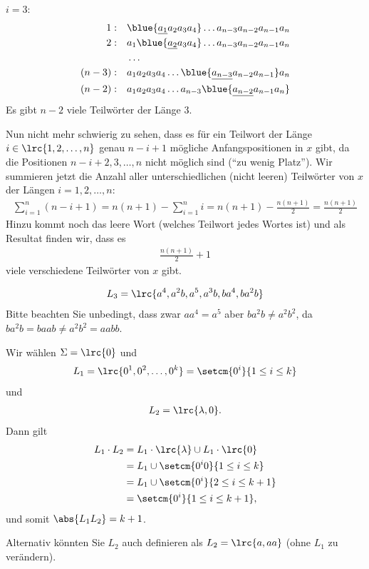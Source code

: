 \begin{myanswer}[mychallenge:0207]
	\underline{$i = 3$}:
	\begin{align*}
		1: \quad    & \blue{\underline{a_1}a_2a_3a_4}\ldots a_{n-3}a_{n-2}a_{n-1}a_n \\
		2: \quad    & a_1\blue{\underline{a_2}a_3a_4}\ldots a_{n-3}a_{n-2}a_{n-1}a_n \\
		            & \ldots                                                         \\
		(n-3):\quad & a_1a_2a_3a_4\ldots \blue{\underline{a_{n-3}}a_{n-2}a_{n-1}}a_n \\
		(n-2):\quad & a_1a_2a_3a_4\ldots a_{n-3}\blue{\underline{a_{n-2}}a_{n-1}a_n}
	\end{align*}
	Es gibt $n-2$ viele Teilwörter der Länge $3$.

	Nun nicht mehr schwierig zu sehen, dass es für ein Teilwort der Länge $i\in\lrc{1,2,\ldots ,n}$ genau $n-i+1$ mögliche Anfangspositionen in $x$ gibt, da die Positionen $n-i+2,3,\ldots ,n$ nicht möglich sind (\enquote{zu wenig Platz}). Wir summieren jetzt die Anzahl aller unterschiedlichen (nicht leeren) Teilwörter von $x$ der Längen $i=1,2,\ldots, n$:
	\begin{align*}
		\sum_{i=1}^n (n-i+1) = n(n+1)-\sum_{i=1}^n i = n(n+1) - \frac{n(n+1)}{2}=\frac{n(n+1)}{2}
	\end{align*}
	Hinzu kommt noch das leere Wort (welches Teilwort jedes Wortes ist) und als Resultat finden wir, dass es
	\begin{align*}
		\frac{n(n+1)}{2} + 1
	\end{align*}
	viele verschiedene Teilwörter von $x$ gibt.
\end{myanswer}

\begin{myanswer}[myexercise:0208]
	\begin{align*}
		L_3 = \lrc{a^4, a^2b, a^5, a^3b,ba^4, ba^2b}
	\end{align*}
	Bitte beachten Sie unbedingt, dass zwar $aa^4 = a^5$ aber $ba^2b \neq a^2b^2$, da $ba^2b = baab \neq a^2b^2 = aabb$.
\end{myanswer}

\begin{myanswer}[mychallenge:0209]
	Wir wählen $\Sigma = \lrc{0}$ und
	\begin{align*}
		L_1 = \lrc{0^1,0^2,\ldots ,0^k} = \setcm{0^i}{1\leq i \leq k}
	\end{align*}
	und
	\begin{align*}
		L_2 = \lrc{\lambda,0}.
	\end{align*}
	Dann gilt
	\begin{align*}
		L_1\cdot L_2 & = L_1\cdot \lrc{\lambda}\cup L_1\cdot \lrc{0} \\
		             & = L_1 \cup \setcm{0^i0}{1\leq i\leq k}        \\
		             & = L_1 \cup \setcm{0^i}{2\leq i \leq k+1}      \\
		             & = \setcm{0^i}{1\leq i\leq k+1},
	\end{align*}
	und somit $\abs{L_1L_2} = k+1$.

	Alternativ könnten Sie $L_2$ auch definieren als $L_2 = \lrc{a, aa}$ (ohne $L_1$ zu verändern).
\end{myanswer}

